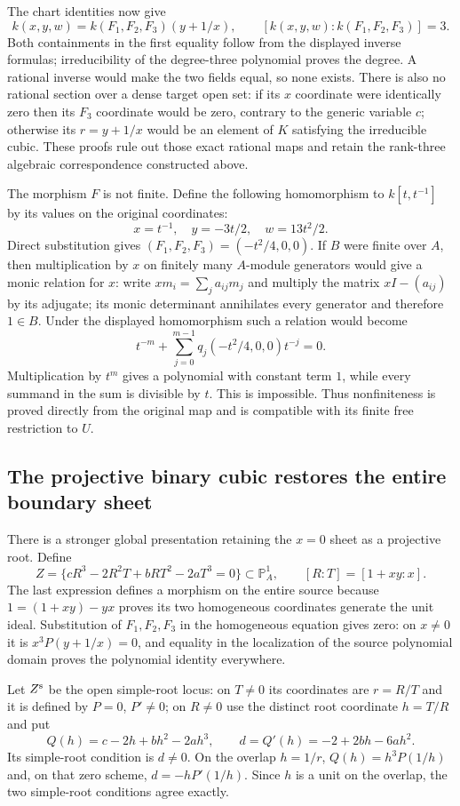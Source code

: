The chart identities now give
\[
 k(x,y,w)=k(F_1,F_2,F_3)(y+1/x),\qquad
 [k(x,y,w):k(F_1,F_2,F_3)]=3.
\]
Both containments in the first equality follow from the displayed
inverse formulas; irreducibility of the degree-three polynomial proves
the degree. A rational inverse would make the two fields equal, so none
exists. There is also no rational section over a dense target open set:
if its $x$ coordinate were identically zero then its $F_3$ coordinate
would be zero, contrary to the generic variable $c$; otherwise its
$r=y+1/x$ would be an element of $K$ satisfying the irreducible cubic.
These proofs rule out those exact rational maps and retain the
rank-three algebraic correspondence constructed above.

The morphism $F$ is not finite. Define the following homomorphism to
$k[t,t^{-1}]$ by its values on the original coordinates:
\[
 x=t^{-1},\quad y=-3t/2,\quad w=13t^2/2.
\]
Direct substitution gives $(F_1,F_2,F_3)=(-t^2/4,0,0)$.
If $B$ were finite over $A$, then multiplication by $x$ on finitely
many $A$-module generators would give a monic relation for $x$:
write $xm_i=\sum_j a_{ij}m_j$ and multiply the matrix $xI-(a_{ij})$
by its adjugate; its monic determinant annihilates every generator and
therefore $1\in B$. Under the displayed homomorphism such a relation
would become
\[
 t^{-m}+\sum_{j=0}^{m-1}q_j(-t^2/4,0,0)t^{-j}=0.
\]
Multiplication by $t^m$ gives a polynomial with constant term $1$,
while every summand in the sum is divisible by $t$. This is impossible.
Thus nonfiniteness is proved directly from the original map and is
compatible with its finite free restriction to $U$.

\subsection{The projective binary cubic restores the entire boundary sheet}

There is a stronger global presentation retaining the $x=0$ sheet as a
projective root. Define
\[
 Z=\{cR^3-2R^2T+bRT^2-2aT^3=0\}\subset\mathbb P^1_A,
 \qquad [R:T]=[1+xy:x].
\]
The last expression defines a morphism on the entire source because
$1=(1+xy)-yx$ proves its two homogeneous coordinates generate the
unit ideal. Substitution of $F_1,F_2,F_3$ in the homogeneous equation
gives zero: on $x\ne0$ it is $x^3P(y+1/x)=0$, and equality in the
localization of the source polynomial domain proves the polynomial
identity everywhere.

Let $Z^{\rm s}$ be the open simple-root locus: on $T\ne0$ its
coordinates are $r=R/T$ and it is defined by $P=0$, $P'\ne0$; on
$R\ne0$ use the distinct root coordinate $h=T/R$ and put
\[
 Q(h)=c-2h+bh^2-2ah^3,\qquad d=Q'(h)=-2+2bh-6ah^2.
\]
Its simple-root condition is $d\ne0$. On the overlap $h=1/r$,
$Q(h)=h^3P(1/h)$ and, on that zero scheme, $d=-hP'(1/h)$.
Since $h$ is a unit on the overlap, the two simple-root conditions
agree exactly.

